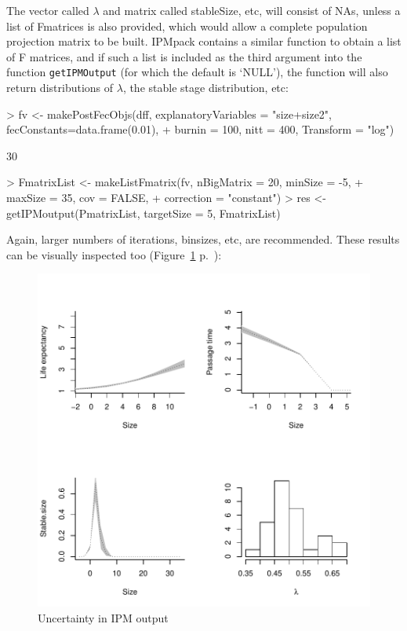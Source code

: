 \documentclass{article}
\begin{document}
The vector called $\lambda$ and matrix called stableSize, etc, will consist of
NAs, unless a list of Fmatrices is also provided, which would allow a complete
population projection matrix to be built. IPMpack contains a similar function to obtain a list of F matrices, and if such a list is included as the third argument into the function {\tt getIPMOutput} (for which the default is `NULL'), the function will also return distributions of $\lambda$, the stable stage distribution, etc:
\begin{Schunk}
\begin{Sinput}
> fv <- makePostFecObjs(dff, explanatoryVariables = "size+size2", fecConstants=data.frame(0.01), 
+                       burnin = 100, nitt = 400, Transform = "log")
\end{Sinput}
\begin{Soutput}
[1] 30
\end{Soutput}
\begin{Sinput}
> FmatrixList <- makeListFmatrix(fv, nBigMatrix = 20, minSize = -5, 
+                                maxSize = 35, cov = FALSE,
+                                correction = "constant")
> res <- getIPMoutput(PmatrixList, targetSize = 5, FmatrixList)
\end{Sinput}
\end{Schunk}

Again, larger numbers of iterations, binsizes, etc, are recommended. These results
can be visually inspected too (Figure~\ref{fig:seven} p.~\pageref{fig:seven}):
\begin{figure}
\begin{center}
\includegraphics{IPMpack_Vignette-fig7}

\end{center}
\caption{Uncertainty in IPM output}
\label{fig:seven}
\end{figure}
\end{document}

